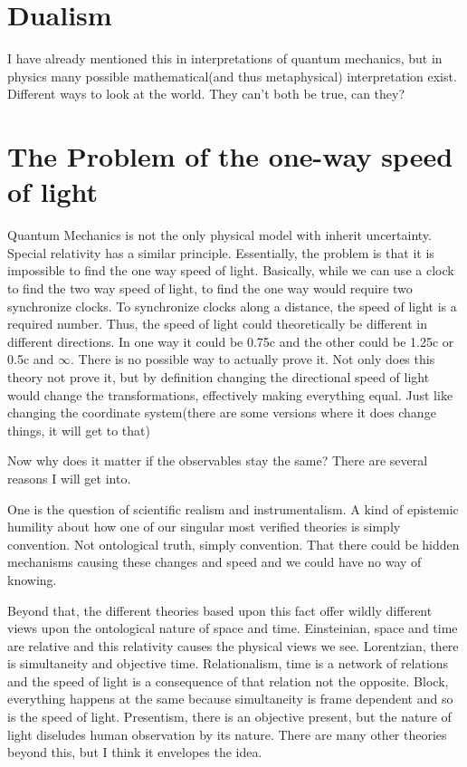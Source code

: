 \section{Dualism}
\par I have already mentioned this in interpretations of quantum mechanics, but in physics many possible mathematical(and thus metaphysical) interpretation exist. Different ways to look at the world. They can't both be true, can they?
\section{The Problem of the one-way speed of light}
Quantum Mechanics is not the only physical model with inherit uncertainty. Special relativity has a similar principle. Essentially, the problem is that
it is impossible to find the one way speed of light. Basically, while we can use a clock to find the two way speed of light, to find the one way would
require two synchronize clocks. To synchronize clocks along a distance, the speed of light is a required number. Thus, the speed of light could theoretically
be different in different directions. In one way it could be 0.75c and the other could be 1.25c or 0.5c and $\infty $. There is no possible way to actually prove it.
Not only does this theory not prove it, but by definition changing the directional speed of light would change the transformations, effectively making everything equal.
Just like changing the coordinate system(there are some versions where it does change things, it will get to that)

Now why does it matter if the observables stay the same? There are several reasons I will get into.

One is the question of scientific realism and instrumentalism. A kind of epistemic humility about how one of our singular most verified theories is simply convention.
Not ontological truth, simply convention. That there could be hidden mechanisms causing these changes and speed and we could have no way of knowing.

Beyond that, the different theories based upon this fact offer wildly different views upon the ontological nature of space and time. Einsteinian, space and time are relative
and this relativity causes the physical views we see. Lorentzian, there is simultaneity and objective time. Relationalism, time is a network of relations
and the speed of light is a consequence of that relation not the opposite. Block, everything happens at the same because simultaneity is frame dependent and
so is the speed of light. Presentism, there is an objective present, but the nature of light diseludes human observation by its nature. There are many other theories beyond this,
but I think it envelopes the idea.

